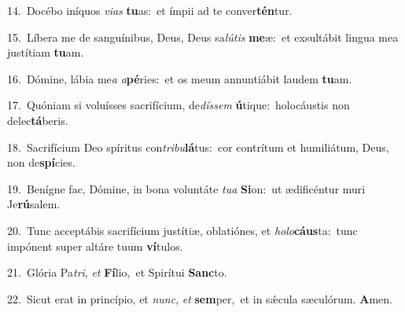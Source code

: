 {\numbfont\textcolor{\numbcolor}{14.}}~Docébo iníquos \textit{vi}\-\textit{as} \textbf{tu}\-as:~\star et ímpii ad te conver\-\textbf{tén}\-tur.\par
{\numbfont\textcolor{\numbcolor}{15.}}~Líbera me de sanguínibus, Deus, Deus sa\-\textit{lú}\-\textit{tis} \textbf{me}\-æ:~\star et exsultábit lingua mea justítiam \textbf{tu}\-am.\par
{\numbfont\textcolor{\numbcolor}{16.}}~Dómine, lábia me\textit{a} \textit{a}\-\textbf{pé}ries:~\star et os meum annuntiábit laudem \textbf{tu}\-am.\par
{\numbfont\textcolor{\numbcolor}{17.}}~Quóniam si voluísses sacrifícium, de\-\textit{dís}\-\textit{sem} \textbf{ú}\-tique:~\star holocáustis non delec\-\textbf{tá}\-beris.\par
{\numbfont\textcolor{\numbcolor}{18.}}~Sacrifícium Deo spíritus con\-\textit{tri}\-\textit{bu}\textbf{lá}tus:~\star cor contrítum et humiliátum, Deus, non de\-\textbf{spí}\-cies.\par
{\numbfont\textcolor{\numbcolor}{19.}}~Benígne fac, Dómine, in bona voluntáte \textit{tu}\-\textit{a} \textbf{Si}\-on:~\star ut ædificéntur muri Je\-\textbf{rú}\-salem.\par
{\numbfont\textcolor{\numbcolor}{20.}}~Tunc acceptábis sacrifícium justítiæ, oblatiónes, et \textit{ho}\-\textit{lo}\textbf{cáus}ta:~\star tunc impónent super altáre tuum \textbf{ví}\-tulos.\par
{\numbfont\textcolor{\numbcolor}{21.}}~Glória Pa\-\textit{tri}\-, \textit{et} \textbf{Fí}\-lio,~\star et Spirítui \textbf{Sanc}\-to.\par
{\numbfont\textcolor{\numbcolor}{22.}}~Sicut erat in princípio, et \textit{nunc}\-, \textit{et} \textbf{sem}\-per,~\star et in sǽcula sæculórum. \textbf{A}\-men.\par
